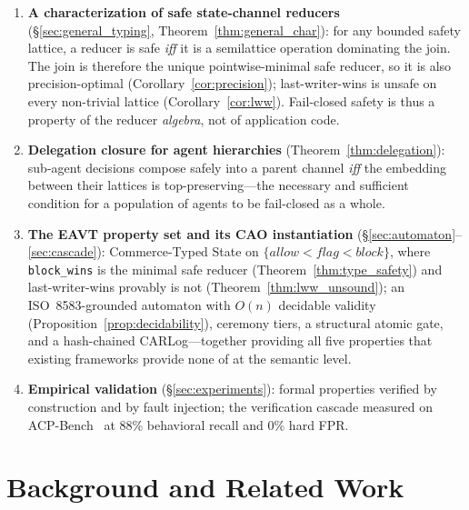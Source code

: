 \documentclass{article}
\begin{document}
\begin{enumerate}
\item \textbf{A characterization of safe state-channel reducers}
(\S\ref{sec:general_typing}, Theorem~\ref{thm:general_char}): for any bounded safety
lattice, a reducer is safe \emph{iff} it is a semilattice operation dominating the join.
The join is therefore the unique pointwise-minimal safe reducer, so it is also
precision-optimal (Corollary~\ref{cor:precision}); last-writer-wins is unsafe on every
non-trivial lattice (Corollary~\ref{cor:lww}). Fail-closed safety is thus a property of
the reducer \emph{algebra}, not of application code.

\item \textbf{Delegation closure for agent hierarchies}
(Theorem~\ref{thm:delegation}): sub-agent decisions compose safely into a parent channel
\emph{iff} the embedding between their lattices is top-preserving---the necessary and
sufficient condition for a population of agents to be fail-closed as a whole.

\item \textbf{The EAVT property set and its CAO instantiation}
(\S\ref{sec:automaton}--\ref{sec:cascade}): Commerce-Typed State on
$\{\textit{allow}<\textit{flag}<\textit{block}\}$, where \texttt{block\_wins} is the minimal
safe reducer (Theorem~\ref{thm:type_safety}) and last-writer-wins provably is not
(Theorem~\ref{thm:lww_unsound}); an ISO~8583-grounded automaton with $O(n)$ decidable validity
(Proposition~\ref{prop:decidability}), ceremony tiers, a structural atomic gate, and a
hash-chained CARLog---together providing all five properties that existing frameworks
provide none of at the semantic level.

\item \textbf{Empirical validation} (\S\ref{sec:experiments}): formal properties verified
by construction and by fault injection; the verification cascade measured on
ACP-Bench~\cite{acpbench} at 88\% behavioral recall and 0\% hard FPR.
\end{enumerate}

\section{Background and Related Work}
\end{document}
